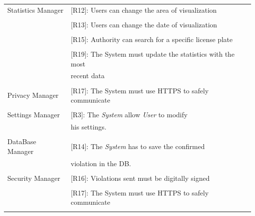 \documentclass{article}
\begin{document}
\begin{center}
\begin{tabular}{ | l | l |}
        \hline
        Statistics Manager & [R12]: Users can change the area of visualization \\\\
                           & [R13]: Users can change the date of visualization \\\\
                           & [R15]: Authority can search for a specific license plate \\\\
                           & [R19]: The System must update the statistics with the most \\
                           & recent data \\\\
        \hline
        Privacy Manager & [R17]: The System must use HTTPS to safely communicate \\\\
        \hline 
        Settings Manager & [R3]: The \textit{System} allow \textit{User} to modify \\
                         &  his settings. \\\\
        \hline
        DataBase Manager & [R14]: The \textit{System} has to save the confirmed \\
                         & violation in the DB. \\\\ 
        \hline
        Security Manager & [R16]: Violations sent must be digitally signed \\\\
                         & [R17]: The System must use HTTPS to safely communicate \\\\
        \hline
    \end{tabular}
    \end{center}
\end{document}
